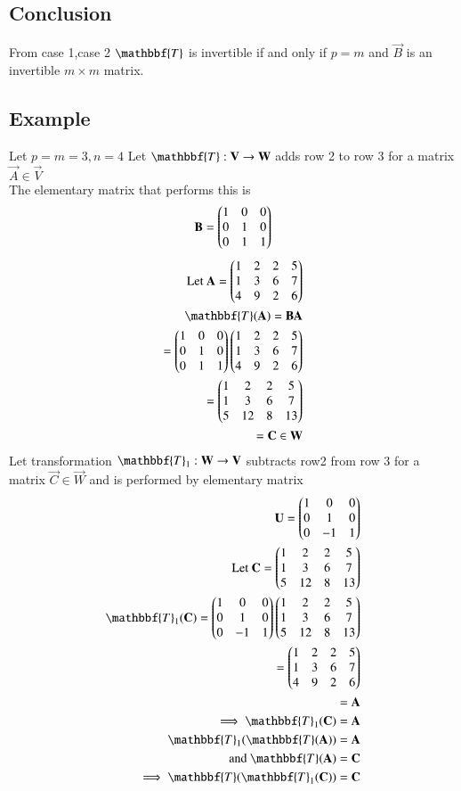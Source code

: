 \documentclass[journal,12pt,twocolumn]{IEEEtran}
\begin{document}
\subsection{Conclusion}
From case 1,case 2 $\mathbbf{T}$ is invertible if and only if $p=m$ and $\vec{B}$ is an invertible $m \times m$ matrix.
\subsection{Example}
Let $p=m=3 ,n=4$
Let $\mathbbf{T}:\vec{V} \rightarrow \vec{W}$ adds row 2 to row 3 for a matrix $\vec{A} \in \vec{V}$\\
The elementary matrix that performs this is
\begin{align}
    \mathbf{B}= \begin{pmatrix}1&0&0\\0&1&0\\0&1&1\end{pmatrix}
\end{align}
\begin{align}
    \text{Let }\vec{A}=\myvec{1&2&2&5\\1&3&6&7\\4&9&2&6}\\
    \mathbbf{T}(\vec{A})=\vec{B}\vec{A}\\=
    \myvec{1&0&0\\0&1&0\\0&1&1}\myvec{1&2&2&5\\1&3&6&7\\4&9&2&6}\\
    =\myvec{1&2&2&5\\1&3&6&7\\5&12&8&13}\\
    =\vec{C} \in \vec{W}
\end{align}
Let transformation $\mathbbf{T}_1:\vec{W} \rightarrow \vec{V}$ subtracts row2 from row 3 for a matrix $\vec{C} \in \vec{W}$ and is performed by elementary matrix
\begin{align}
\vec{U}=\myvec{1&0&0\\0&1&0\\0&-1&1}\\
     \text{Let }\vec{C}=\myvec{1&2&2&5\\1&3&6&7\\5&12&8&13}\\
     \mathbbf{T}_1(\vec{C})=\myvec{1&0&0\\0&1&0\\0&-1&1}\myvec{1&2&2&5\\1&3&6&7\\5&12&8&13}\\
     =\myvec{1&2&2&5\\1&3&6&7\\4&9&2&6}\\=\vec{A}\\
     \implies \mathbbf{T}_1(\vec{C})=\vec{A}\\
     \mathbbf{T}_1(\mathbbf{T}(\vec{A}))=\vec{A}\\
     \text{and  } \mathbbf{T}(\vec{A})=\vec{C}\\
     \implies \mathbbf{T}(\mathbbf{T}_1(\vec{C}))=\vec{C}
     \end{align}
\end{document}
